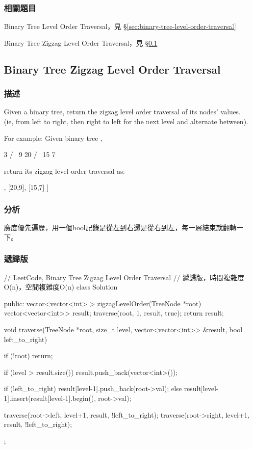 \subsubsection{相關題目}
\begindot
\item Binary Tree Level Order Traversal，見 \S \ref{sec:binary-tree-level-order-traversal}
\item Binary Tree Zigzag Level Order Traversal，見 \S \ref{sec:binary-tree-zigzag-level-order-traversal}
\myenddot


\subsection{Binary Tree Zigzag Level Order Traversal}
\label{sec:binary-tree-zigzag-level-order-traversal}


\subsubsection{描述}
Given a binary tree, return the zigzag level order traversal of its nodes' values. (ie, from left to right, then right to left for the next level and alternate between).

For example:
Given binary tree ,
\begin{Code}
    3
   / \
  9  20
    /  \
   15   7
\end{Code}
return its zigzag level order traversal as:
\begin{Code}
[
  [3],
  [20,9],
  [15,7]
]
\end{Code}


\subsubsection{分析}
廣度優先遍歷，用一個bool記錄是從左到右還是從右到左，每一層結束就翻轉一下。


\subsubsection{遞歸版}
\begin{Code}
// LeetCode, Binary Tree Zigzag Level Order Traversal
// 遞歸版，時間複雜度O(n)，空間複雜度O(n)
class Solution {
public:
    vector<vector<int> > zigzagLevelOrder(TreeNode *root) {
        vector<vector<int>> result;
        traverse(root, 1, result, true);
        return result;
    }

    void traverse(TreeNode *root, size_t level, vector<vector<int>> &result,
            bool left_to_right) {
        if (!root) return;

        if (level > result.size())
            result.push_back(vector<int>());

        if (left_to_right)
            result[level-1].push_back(root->val);
        else
            result[level-1].insert(result[level-1].begin(), root->val);

        traverse(root->left, level+1, result, !left_to_right);
        traverse(root->right, level+1, result, !left_to_right);
    }
};
\end{Code}

